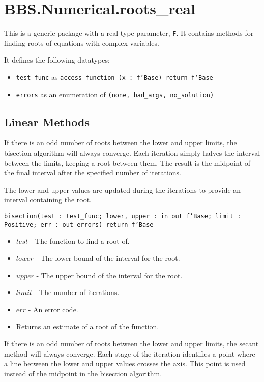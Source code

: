 \documentclass[10pt, openany]{book}
\newcommand{\function}[1]{\texttt{#1}}
\newcommand{\datatype}[1]{\texttt{#1}}
\begin{document}
\section{BBS.Numerical.roots\_real}
This is a generic package with a real type parameter, \datatype{F}.  It contains methods for finding roots of equations with complex variables.

It defines the following datatypes:
\begin{itemize}
   \item \datatype{test\_func} as \datatype{access function (x : f'Base) return f'Base}
   \item \datatype{errors} as an enumeration of \datatype{(none, bad\_args, no\_solution)}
\end{itemize}

\subsection{Linear Methods}
If there is an odd number of roots between the lower and upper limits, the bisection algorithm will always converge.  Each iteration simply halves the interval between the limits, keeping a root between them.  The result is the midpoint of the final interval after the specified number of iterations.

The lower and upper values are updated during the iterations to provide an interval containing the root.

\function{bisection(test : test\_func; lower, upper : in out f'Base; limit : Positive; err : out errors) return f'Base}
\begin{itemize}
  \item $test$ - The function to find a root of.
  \item $lower$ - The lower bound of the interval for the root.
  \item $upper$ - The upper bound of the interval for the root.
  \item $limit$ - The number of iterations.
  \item $err$ - An error code.
  \item Returns an estimate of a root of the function.
\end{itemize}

If there is an odd number of roots between the lower and upper limits, the secant method will always converge.  Each stage of the iteration identifies a point where a line between the lower and upper values crosses the axis.  This point is used instead of the midpoint in the bisection algorithm.
\end{document}
